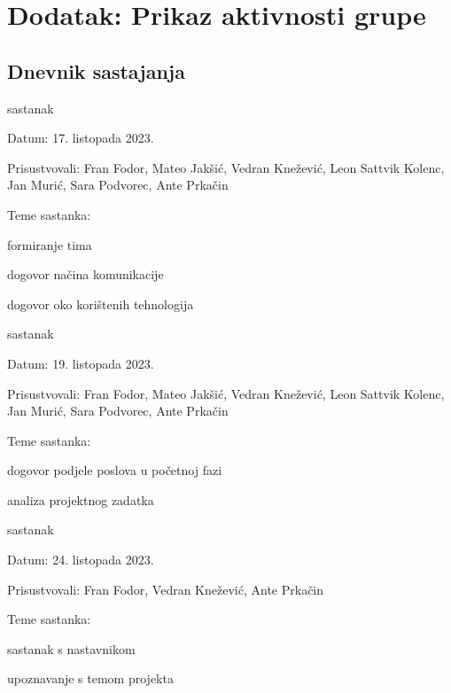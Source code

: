 \chapter*{Dodatak: Prikaz aktivnosti grupe}
		
		\section*{Dnevnik sastajanja}

		\begin{packed_enum}
			\item  sastanak
			\item[] \begin{packed_item}
				\item Datum: {17. listopada 2023.}
				\item Prisustvovali: {Fran Fodor, Mateo Jakšić, Vedran Knežević, Leon Sattvik Kolenc, Jan Murić, Sara Podvorec, Ante Prkačin}
				\item Teme sastanka:
				\begin{packed_item}
					\item  formiranje tima
					\item  dogovor načina komunikacije  
					\item  dogovor oko korištenih tehnologija
				\end{packed_item}
			\end{packed_item}
			
			\item  sastanak
			\item[] \begin{packed_item}
				\item Datum: {19. listopada 2023.}
				\item Prisustvovali: {Fran Fodor, Mateo Jakšić, Vedran Knežević, Leon Sattvik Kolenc, Jan Murić, Sara Podvorec, Ante Prkačin}
				\item Teme sastanka:
				\begin{packed_item}
					\item  dogovor podjele poslova u početnoj fazi
					\item  analiza projektnog zadatka
				\end{packed_item}
			\end{packed_item}

			\item  sastanak
			\item[] \begin{packed_item}
				\item Datum: {24. listopada 2023.}
				\item Prisustvovali: {Fran Fodor, Vedran Knežević, Ante Prkačin}
				\item Teme sastanka:
				\begin{packed_item}
					\item  sastanak s nastavnikom
					\item  upoznavanje s temom projekta
				\end{packed_item}
			\end{packed_item}


\end{packed_enum}
